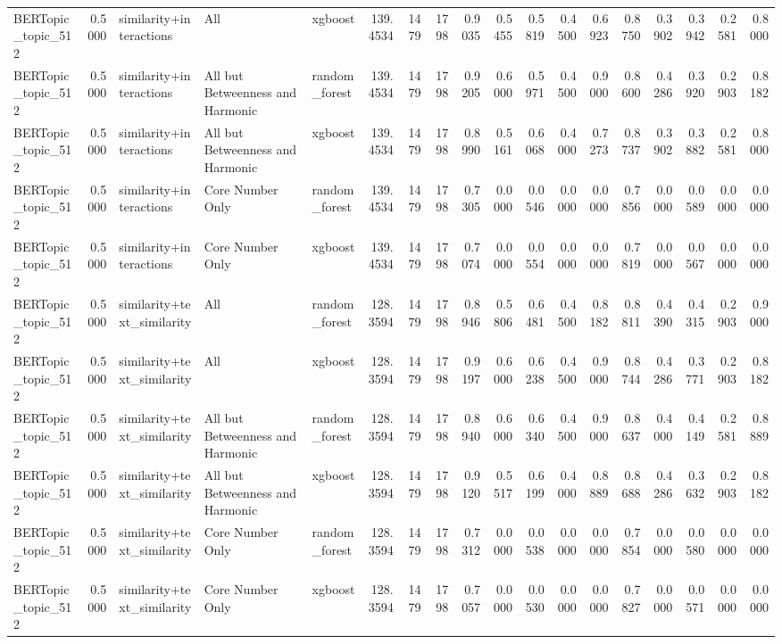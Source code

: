 \begin{tabular}{lrlllrrrrrrrrrrrrr}
BERTopic_topic_512 & 0.5000 & similarity+interactions & All & xgboost & 139.4534 & 1479 & 1798 & 0.9035 & 0.5455 & 0.5819 & 0.4500 & 0.6923 & 0.8750 & 0.3902 & 0.3942 & 0.2581 & 0.8000 \\
BERTopic_topic_512 & 0.5000 & similarity+interactions & All but Betweenness and Harmonic & random_forest & 139.4534 & 1479 & 1798 & 0.9205 & 0.6000 & 0.5971 & 0.4500 & 0.9000 & 0.8600 & 0.4286 & 0.3920 & 0.2903 & 0.8182 \\
BERTopic_topic_512 & 0.5000 & similarity+interactions & All but Betweenness and Harmonic & xgboost & 139.4534 & 1479 & 1798 & 0.8990 & 0.5161 & 0.6068 & 0.4000 & 0.7273 & 0.8737 & 0.3902 & 0.3882 & 0.2581 & 0.8000 \\
BERTopic_topic_512 & 0.5000 & similarity+interactions & Core Number Only & random_forest & 139.4534 & 1479 & 1798 & 0.7305 & 0.0000 & 0.0546 & 0.0000 & 0.0000 & 0.7856 & 0.0000 & 0.0589 & 0.0000 & 0.0000 \\
BERTopic_topic_512 & 0.5000 & similarity+interactions & Core Number Only & xgboost & 139.4534 & 1479 & 1798 & 0.7074 & 0.0000 & 0.0554 & 0.0000 & 0.0000 & 0.7819 & 0.0000 & 0.0567 & 0.0000 & 0.0000 \\
BERTopic_topic_512 & 0.5000 & similarity+text_similarity & All & random_forest & 128.3594 & 1479 & 1798 & 0.8946 & 0.5806 & 0.6481 & 0.4500 & 0.8182 & 0.8811 & 0.4390 & 0.4315 & 0.2903 & 0.9000 \\
BERTopic_topic_512 & 0.5000 & similarity+text_similarity & All & xgboost & 128.3594 & 1479 & 1798 & 0.9197 & 0.6000 & 0.6238 & 0.4500 & 0.9000 & 0.8744 & 0.4286 & 0.3771 & 0.2903 & 0.8182 \\
BERTopic_topic_512 & 0.5000 & similarity+text_similarity & All but Betweenness and Harmonic & random_forest & 128.3594 & 1479 & 1798 & 0.8940 & 0.6000 & 0.6340 & 0.4500 & 0.9000 & 0.8637 & 0.4000 & 0.4149 & 0.2581 & 0.8889 \\
BERTopic_topic_512 & 0.5000 & similarity+text_similarity & All but Betweenness and Harmonic & xgboost & 128.3594 & 1479 & 1798 & 0.9120 & 0.5517 & 0.6199 & 0.4000 & 0.8889 & 0.8688 & 0.4286 & 0.3632 & 0.2903 & 0.8182 \\
BERTopic_topic_512 & 0.5000 & similarity+text_similarity & Core Number Only & random_forest & 128.3594 & 1479 & 1798 & 0.7312 & 0.0000 & 0.0538 & 0.0000 & 0.0000 & 0.7854 & 0.0000 & 0.0580 & 0.0000 & 0.0000 \\
BERTopic_topic_512 & 0.5000 & similarity+text_similarity & Core Number Only & xgboost & 128.3594 & 1479 & 1798 & 0.7057 & 0.0000 & 0.0530 & 0.0000 & 0.0000 & 0.7827 & 0.0000 & 0.0571 & 0.0000 & 0.0000 \\

\end{tabular}
